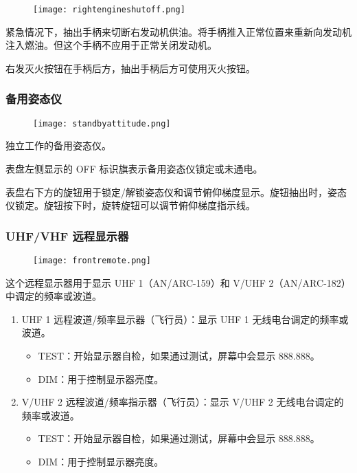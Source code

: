 \begin{figure}[htb]
	\centering
	\texttt{[image: rightengineshutoff.png]}
\end{figure}
紧急情况下，抽出手柄来切断右发动机供油。将手柄推入正常位置来重新向发动机注入燃油。但这个手柄不应用于正常关闭发动机。

右发灭火按钮在手柄后方，抽出手柄后方可使用灭火按钮。

\subsubsection{备用姿态仪}

\begin{figure}[htb]
	\centering
	\texttt{[image: standbyattitude.png]}
\end{figure}
独立工作的备用姿态仪。

表盘左侧显示的 OFF 标识旗表示备用姿态仪锁定或未通电。

表盘右下方的旋钮用于锁定/解锁姿态仪和调节俯仰梯度显示。旋钮抽出时，姿态仪锁定。旋钮按下时，旋转旋钮可以调节俯仰梯度指示线。

\subsubsection{UHF/VHF 远程显示器}

\begin{figure}[htb]
	\centering
	\texttt{[image: frontremote.png]}
\end{figure}
这个远程显示器用于显示 UHF 1（AN/ARC-159）和 V/UHF 2（AN/ARC-182）中调定的频率或波道。

\begin{enumerate}
	\item UHF 1 远程波道/频率显示器（飞行员）：显示 UHF 1 无线电台调定的频率或波道。
	      \begin{itemize}
		      \item TEST：开始显示器自检，如果通过测试，屏幕中会显示 888.888。
		      \item DIM：用于控制显示器亮度。
	      \end{itemize}
	\item V/UHF 2 远程波道/频率指示器（飞行员）：显示 V/UHF 2 无线电台调定的频率或波道。
	      \begin{itemize}
		      \item TEST：开始显示器自检，如果通过测试，屏幕中会显示 888.888。
		      \item DIM：用于控制显示器亮度。
	      \end{itemize}
\end{enumerate}

